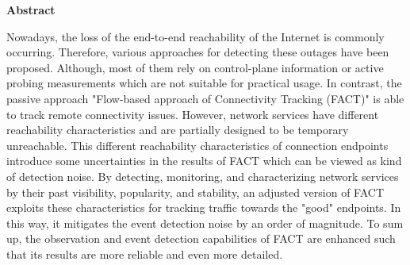 

%
%
%
%
%
%
%
%
%
%
\clearpage \null 
\vfil 
\begin{center}
	\textbf{Abstract} 
\end{center}

Nowadays, the loss of the end-to-end reachability of the Internet is commonly occurring.
Therefore, various approaches for detecting these outages have been proposed. 
Although, most of them rely on control-plane information or active probing measurements which are not suitable for practical usage. 
In contrast, the passive approach "Flow-based approach of Connectivity Tracking (FACT)" is able to track remote connectivity issues. 
However, network services have different reachability characteristics and are partially designed to be temporary unreachable. 
This different reachability characteristics of connection endpoints introduce some uncertainties in the results of FACT which can be viewed as kind of detection noise. 
By detecting, monitoring, and characterizing network services by their past visibility, popularity, and stability, an adjusted version of FACT exploits these characteristics for tracking traffic towards the "good" endpoints. In this way, it mitigates the event detection noise by an order of magnitude. 
To sum up, the observation and event detection capabilities of FACT are enhanced such that its results are more reliable and even more detailed.

